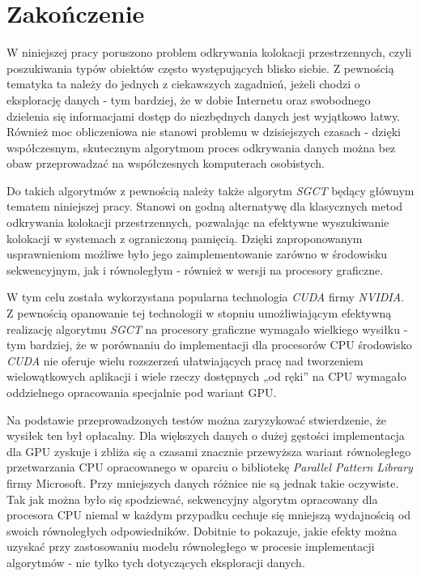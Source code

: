 \documentclass[12pt]{article}
\begin{document}
\newpage

\section{Zakończenie}
\label{sec:fin}

W niniejszej pracy poruszono problem odkrywania kolokacji przestrzennych, czyli poszukiwania typów obiektów często występujących blisko siebie. Z pewnością tematyka ta należy do jednych z ciekawszych zagadnień, jeżeli chodzi o eksplorację danych - tym bardziej, że w dobie Internetu oraz swobodnego dzielenia się informacjami dostęp do niezbędnych danych jest wyjątkowo łatwy. Również moc obliczeniowa nie stanowi problemu w dzisiejszych czasach - dzięki współczesnym, skutecznym algorytmom proces odkrywania danych można bez obaw przeprowadzać na współczesnych komputerach osobistych.

Do takich algorytmów z pewnością należy także algorytm \textit{SGCT} \cite{chinczyki} będący głównym tematem niniejszej pracy. Stanowi on godną alternatywę dla klasycznych metod odkrywania kolokacji przestrzennych, pozwalając na efektywne wyszukiwanie kolokacji w systemach z ograniczoną pamięcią. Dzięki zaproponowanym usprawnieniom możliwe było jego zaimplementowanie zarówno w środowisku sekwencyjnym, jak i równoległym - również w wersji na procesory graficzne.

W tym celu została wykorzystana popularna technologia \textit{CUDA} firmy \textit{NVIDIA}. Z pewnością opanowanie tej technologii w stopniu umożliwiającym efektywną realizację algorytmu \textit{SGCT} na procesory graficzne wymagało wielkiego wysiłku - tym bardziej, że w porównaniu do implementacji dla procesorów CPU środowisko \textit{CUDA} nie oferuje wielu rozszerzeń ułatwiających pracę nad tworzeniem wielowątkowych aplikacji i wiele rzeczy dostępnych „od ręki” na CPU wymagało oddzielnego opracowania specjalnie pod wariant GPU.

Na podstawie przeprowadzonych testów można zaryzykować stwierdzenie, że wysiłek ten był opłacalny. Dla większych danych o dużej gęstości implementacja dla GPU zyskuje i zbliża się a czasami znacznie przewyższa wariant równoległego przetwarzania CPU opracowanego w oparciu o bibliotekę \textit{Parallel Pattern Library} firmy Microsoft. Przy mniejszych danych różnice nie są jednak takie oczywiste.
Tak jak można było się spodziewać, sekwencyjny algorytm opracowany dla procesora CPU niemal w każdym przypadku cechuje się mniejszą wydajnością od swoich równoległych odpowiedników. Dobitnie to pokazuje, jakie efekty można uzyskać przy zastosowaniu modelu równoległego w procesie implementacji algorytmów - nie tylko tych dotyczących eksploracji danych.
\end{document}
